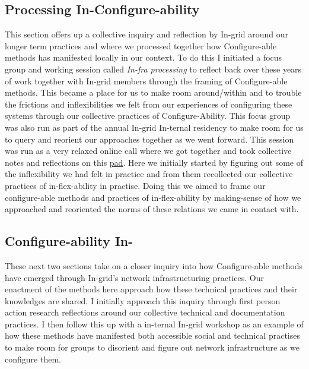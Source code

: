 \hypertarget{processing-in-configure-ability}{%
\subsection[Processing
In-Configure-ability]{\texorpdfstring{\protect\hypertarget{anchor}{}{}Processing
In-Configure-ability}{Processing In-Configure-ability}}\label{processing-in-configure-ability}}

This section offers up a collective inquiry and reflection by In-grid
around our longer term practices and where we processed together how
Configure-able methods has manifested locally in our context. To do this
I initiated a focus group and working session called \emph{In-fra
processing} to reflect back over these years of work together with
In-grid members through the framing of Configure-able methods. This
became a place for us to make room around/within and to trouble the
frictions and inflexibilities we felt from our experiences of
configuring these systems through our collective practices of
Configure-Ability. This focus group was also run as part of the annual
In-grid In-ternal residency to make room for us to query and reorient
our approaches together as we went forward. This session was run as a
very relaxed online call where we got together and took collective notes
and reflections on this
\href{https://digitalcare.noho.st/pad/p/Infra_processing}{pad}. Here we
initially started by figuring out some of the inflexibility we had felt
in practice and from them recollected our collective practices of
in-flex-ability in practise. Doing this we aimed to frame our
configure-able methods and practices of in-flex-ability by making-sense
of how we approached and reoriented the norms of these relations we came
in contact with.

\hypertarget{configure-ability-in-}{%
\subsection[Configure-ability
In-]{\texorpdfstring{\protect\hypertarget{anchor}{}{}Configure-ability
In-}{Configure-ability In-}}\label{configure-ability-in-}}

These next two sections take on a closer inquiry into how Configure-able
methods have emerged through In-grid's network infrastructuring
practices. Our enactment of the methods here approach how these
technical practices and their knowledges are shared. I initially
approach this inquiry through first person action research reflections
around our collective technical and documentation practices. I then
follow this up with a in-ternal In-grid workshop as an example of how
these methods have manifested both accessible social and technical
practises to make room for groups to disorient and figure out network
infrastructure as we configure them.

